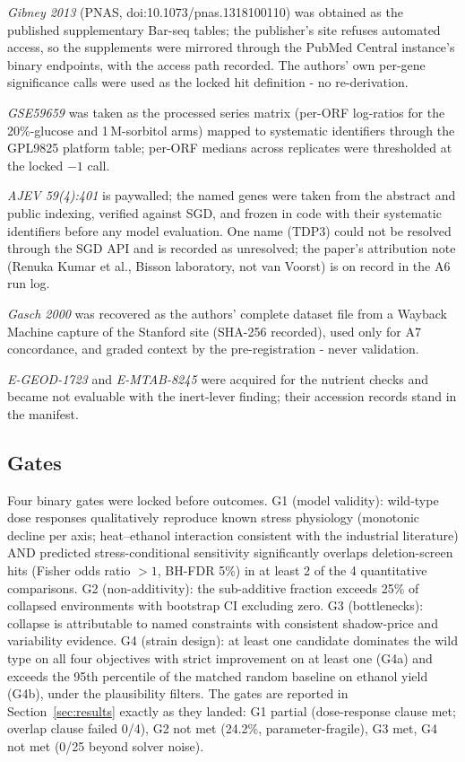 \documentclass[12pt]{article}
\begin{document}
\emph{Gibney 2013} (PNAS, doi:10.1073/pnas.1318100110) was obtained
as the published supplementary Bar-seq tables; the publisher's site
refuses automated access, so the supplements were mirrored through
the PubMed Central instance's binary endpoints, with the access path
recorded. The authors' own per-gene significance calls were used as
the locked hit definition - no re-derivation.

\emph{GSE59659} was taken as the processed series matrix (per-ORF
log-ratios for the 20\%-glucose and 1\,M-sorbitol arms) mapped to
systematic identifiers through the GPL9825 platform table; per-ORF
medians across replicates were thresholded at the locked $-1$ call.

\emph{AJEV 59(4):401} is paywalled; the named genes were taken from
the abstract and public indexing, verified against SGD, and frozen in
code with their systematic identifiers before any model evaluation.
One name (TDP3) could not be resolved through the SGD API and is
recorded as unresolved; the paper's attribution note (Renuka Kumar
et al., Bisson laboratory, not van Voorst) is on record in the A6 run
log.

\emph{Gasch 2000} was recovered as the authors' complete dataset file
from a Wayback Machine capture of the Stanford site (SHA-256 recorded),
used only for A7 concordance, and graded context by the
pre-registration - never validation.

\emph{E-GEOD-1723} and \emph{E-MTAB-8245} were acquired for the
nutrient checks and became not evaluable with the inert-lever finding;
their accession records stand in the manifest.

\subsection{Gates}
\label{sec:gates}

Four binary gates were locked before outcomes. G1 (model validity):
wild-type dose responses qualitatively reproduce known stress physiology
(monotonic decline per axis; heat--ethanol interaction consistent with
the industrial literature) AND predicted stress-conditional sensitivity
significantly overlaps deletion-screen hits (Fisher odds ratio $>1$,
BH-FDR 5\%) in at least 2 of the 4 quantitative comparisons. G2
(non-additivity): the sub-additive fraction exceeds 25\% of collapsed
environments with bootstrap CI excluding zero. G3 (bottlenecks):
collapse is attributable to named constraints with consistent
shadow-price and variability evidence. G4 (strain design): at least one
candidate dominates the wild type on all four objectives with strict
improvement on at least one (G4a) and exceeds the 95th percentile of the
matched random baseline on ethanol yield (G4b), under the plausibility
filters. The gates are reported in Section~\ref{sec:results} exactly as
they landed: G1 partial (dose-response clause met; overlap clause failed
0/4), G2 not met (24.2\%, parameter-fragile), G3 met, G4 not met (0/25
beyond solver noise).
\end{document}
